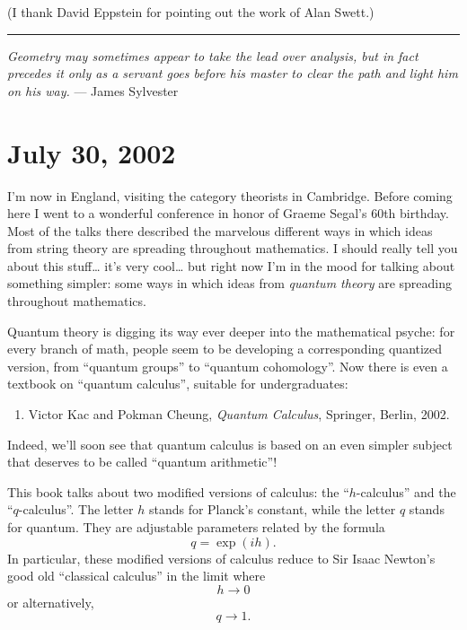 \documentclass{article}
\def\tightlist{}
\begin{document}
(I thank David Eppstein for pointing out the work of Alan Swett.)

\begin{center}\rule{0.5\linewidth}{0.5pt}\end{center}

\emph{Geometry may sometimes appear to take the lead over analysis, but
in fact precedes it only as a servant goes before his master to clear
the path and light him on his way.} --- James Sylvester



\hypertarget{week183}{%
\section{July 30, 2002}\label{week183}}

I'm now in England, visiting the category theorists in Cambridge. Before
coming here I went to a wonderful conference in honor of Graeme Segal's
60th birthday. Most of the talks there described the marvelous different
ways in which ideas from string theory are spreading throughout
mathematics. I should really tell you about this stuff\ldots{} it's very
cool\ldots{} but right now I'm in the mood for talking about something
simpler: some ways in which ideas from \emph{quantum theory} are
spreading throughout mathematics.

Quantum theory is digging its way ever deeper into the mathematical
psyche: for every branch of math, people seem to be developing a
corresponding quantized version, from ``quantum groups'' to ``quantum
cohomology''. Now there is even a textbook on ``quantum calculus'',
suitable for undergraduates:

\begin{enumerate}
\def\labelenumi{\arabic{enumi})}
\tightlist
\item
  Victor Kac and Pokman Cheung, \emph{Quantum Calculus}, Springer,
  Berlin, 2002.
\end{enumerate}

Indeed, we'll soon see that quantum calculus is based on an even simpler
subject that deserves to be called ``quantum arithmetic''!

This book talks about two modified versions of calculus: the
``\(h\)-calculus'' and the ``\(q\)-calculus''. The letter \(h\) stands
for Planck's constant, while the letter \(q\) stands for quantum. They
are adjustable parameters related by the formula \[q = \exp(ih).\] In
particular, these modified versions of calculus reduce to Sir Isaac
Newton's good old ``classical calculus'' in the limit where \[h \to 0\]
or alternatively, \[q \to 1.\]
\end{document}
